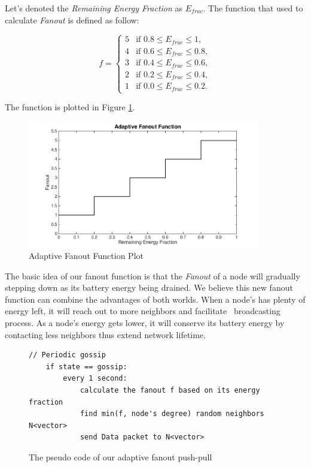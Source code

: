 Let's denoted the \emph{Remaining Energy Fraction} as $E_{frac}$. The function that used to calculate \emph{Fanout} is defined as follow:

\begin{equation*}
	f = \left\{
	\begin{array}{rl}
		5 & \text{if } 0.8 \leq E_{frac} \leq 1,\\
		4 & \text{if } 0.6 \leq E_{frac} \leq 0.8,\\
		3 & \text{if } 0.4 \leq E_{frac} \leq 0.6,\\
		2 & \text{if } 0.2 \leq E_{frac} \leq 0.4,\\					
		1 & \text{if } 0.0 \leq E_{frac} \leq 0.2.
	\end{array} \right.
\end{equation*}

The function is plotted in Figure \ref{fig:step}.

\begin{figure}[h]
	\centering
	\includegraphics[width=4in]{stepFunction2.png}
	\caption{Adaptive Fanout Function Plot}
	\label{fig:step}
\end{figure}

The basic idea of our fanout function is that the \emph{Fanout} of a node will gradually stepping down as its battery energy being drained. We believe this new fanout function can combine the advantages of both worlds. When a node's has plenty of energy left, it will reach out to more neighbors and facilitate \msg ~broadcasting process. As a node's energy gets lower, it will conserve its battery energy by contacting less neighbors thus extend network lifetime.

\begin{figure}[!htbp]
	\centering
	\begin{Verbatim}[fontsize=\small]	
	// Periodic gossip	
	if state == gossip:
		every 1 second:
			calculate the fanout f based on its energy fraction
			find min(f, node's degree) random neighbors N<vector>
			send Data packet to N<vector>
	\end{Verbatim}
	\caption{The pseudo code of our adaptive fanout push-pull \gp}
	\label{fig:gossip}
\end{figure}

